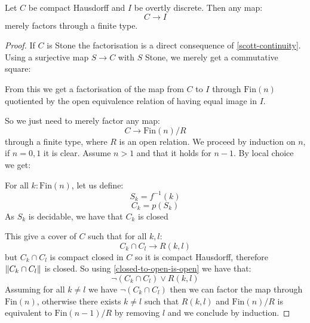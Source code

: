\begin{theorem}[Factorisation]
Let $C$ be compact Hausdorff and $I$ be overtly discrete. Then any map:
\[C\to I\]
merely factors through a finite type.
\end{theorem}

\begin{proof}
If $C$ is Stone the factorisation is a direct consequence of \cref{scott-continuity}. Using a surjective map $S\to C$ with $S$ Stone, we merely get a commutative square:
\begin{center}
\end{center}
From this we get a factorisation of the map from $C$ to $I$ through $\mathrm{Fin}(n)$ quotiented by the open equivalence relation of having equal image in $I$.

So we just need to merely factor any map:
\[C\to \mathrm{Fin}(n)/R\] 
through a finite type, where $R$ is an open relation. We proceed by induction on $n$, if $n=0,1$ it is clear. Assume $n>1$ and that it holds for $n-1$. By local choice we get:

\begin{center}
\end{center}

For all $k:\mathrm{Fin}(n)$, let us define:
\[S_k = f^{-1}(k)\]
\[C_k = p(S_k)\]
As $S_k$ is decidable, we have that $C_k$ is closed

This give a cover of $C$ such that for all $k,l$:
\[C_k\cap C_l \to R(k,l)\]
but $C_k\cap C_l$ is compact closed in $C$ so it is compact Hausdorff, therefore $\lVert C_k\cap C_l \rVert$ is closed. So using \cref{closed-to-open-is-open} we have that:
\[\neg(C_k\cap C_l) \lor R(k,l)\]
Assuming for all $k\not=l$ we have $\neg(C_k\cap C_l)$ then we can factor the map through $\mathrm{Fin}(n)$, otherwise there exists $k\not=l$ such that $R(k,l)$ and $\mathrm{Fin}(n)/R$ is equivalent to $\mathrm{Fin}(n-1)/R$ by removing $l$ and we conclude by induction.
\end{proof}
